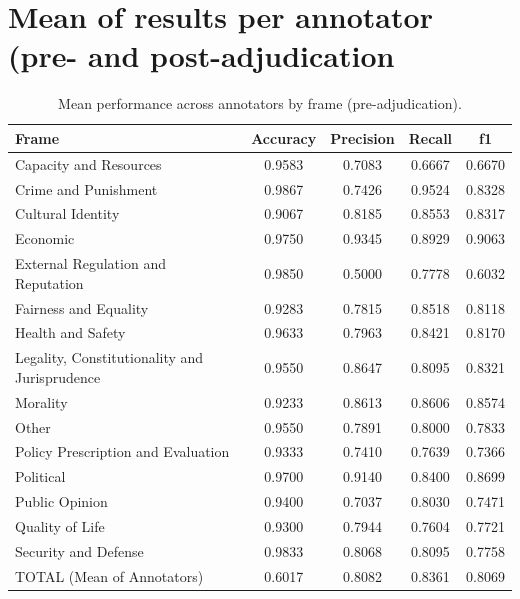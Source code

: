 \documentclass[
10pt, %
a4paper, %
oneside, %
headinclude,footinclude, %
] {book}%
\begin{document}
\section{Mean of results per annotator (pre- and post-adjudication}
\begin{table}[htbp]
\centering
\small
\begin{tabular}{|l|c|c|c|c|}
\hline
\textbf{Frame} & \textbf{Accuracy} & \textbf{Precision} & \textbf{Recall} & \textbf{f1} \\
\hline
Capacity and Resources & 0.9583 & 0.7083 & 0.6667 & 0.6670 \\\hline
Crime and Punishment & 0.9867 & 0.7426 & 0.9524 & 0.8328 \\\hline
Cultural Identity & 0.9067 & 0.8185 & 0.8553 & 0.8317 \\\hline
Economic & 0.9750 & 0.9345 & 0.8929 & 0.9063 \\\hline
External Regulation and Reputation & 0.9850 & 0.5000 & 0.7778 & 0.6032 \\\hline
Fairness and Equality & 0.9283 & 0.7815 & 0.8518 & 0.8118 \\\hline
Health and Safety & 0.9633 & 0.7963 & 0.8421 & 0.8170 \\\hline
Legality, Constitutionality and Jurisprudence & 0.9550 & 0.8647 & 0.8095 & 0.8321 \\\hline
Morality & 0.9233 & 0.8613 & 0.8606 & 0.8574 \\\hline
Other & 0.9550 & 0.7891 & 0.8000 & 0.7833 \\\hline
Policy Prescription and Evaluation & 0.9333 & 0.7410 & 0.7639 & 0.7366 \\\hline
Political & 0.9700 & 0.9140 & 0.8400 & 0.8699 \\\hline
Public Opinion & 0.9400 & 0.7037 & 0.8030 & 0.7471 \\\hline
Quality of Life & 0.9300 & 0.7944 & 0.7604 & 0.7721 \\\hline
Security and Defense & 0.9833 & 0.8068 & 0.8095 & 0.7758 \\\hline
TOTAL (Mean of Annotators) & 0.6017 & 0.8082 & 0.8361 & 0.8069 \\
\hline
\end{tabular}
\caption{Mean performance across annotators by frame (pre-adjudication).}
\label{tab:pre-mean_annotator_performance}
\end{table}
\end{document}
